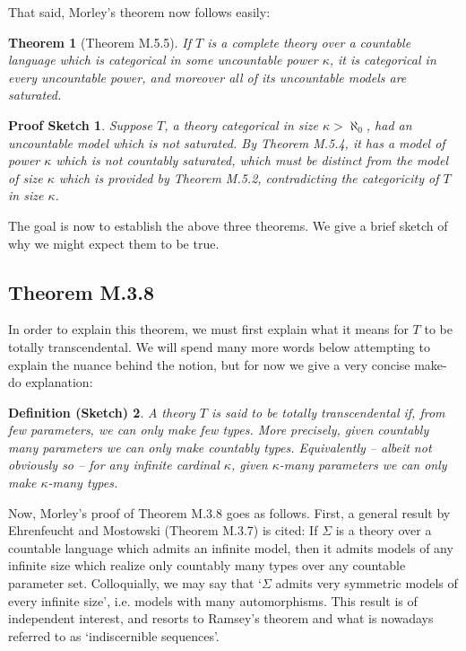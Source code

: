 \documentclass{article}
\newtheorem{theorem}{Theorem}[section]
\newtheorem{defsketch}[theorem]{Definition (Sketch)}
\theoremstyle{nonumberplain}
\newtheorem{sketch}{Proof Sketch}
\begin{document}
That said, Morley's theorem now follows easily:

\begin{theorem}[Theorem M.5.5]
If $T$ is a complete theory over a countable language which is categorical in some uncountable power $\kappa$, it is categorical in every uncountable power, and moreover all of its uncountable models are saturated.
\end{theorem}

\begin{sketch}
Suppose $T$, a theory categorical in size $\kappa > \aleph_0$, had an uncountable model which is not saturated. By Theorem M.5.4, it has a model of power $\kappa$ which is not countably saturated, which must be distinct from the model of size $\kappa$ which is provided by Theorem M.5.2, contradicting the categoricity of $T$ in size $\kappa$.
\end{sketch}

The goal is now to establish the above three theorems. We give a brief sketch of why we might expect them to be true.

\subsection{Theorem M.3.8}

In order to explain this theorem, we must first explain what it means for $T$ to be totally transcendental. We will spend many more words below attempting to explain the nuance behind the notion, but for now we give a very concise make-do explanation:
\begin{defsketch}\label{defsketch:tt}
A theory $T$ is said to be totally transcendental if, from few parameters, we can only make few types. More precisely, given countably many parameters we can only make countably types. Equivalently -- albeit not obviously so -- for any infinite cardinal $\kappa$, given $\kappa$-many parameters we can only make $\kappa$-many types.
\end{defsketch}

Now, Morley's proof of Theorem M.3.8 goes as follows. First, a general result by Ehrenfeucht and Mostowski (Theorem M.3.7) is cited: If $\Sigma$ is a theory over a countable language which admits an infinite model, then it admits models of any infinite size which realize only countably many types over any countable parameter set. Colloquially, we may say that `$\Sigma$ admits very symmetric models of every infinite size', i.e. models with many automorphisms. This result is of independent interest, and resorts to Ramsey's theorem and what is nowadays referred to as `indiscernible sequences'.
\end{document}

